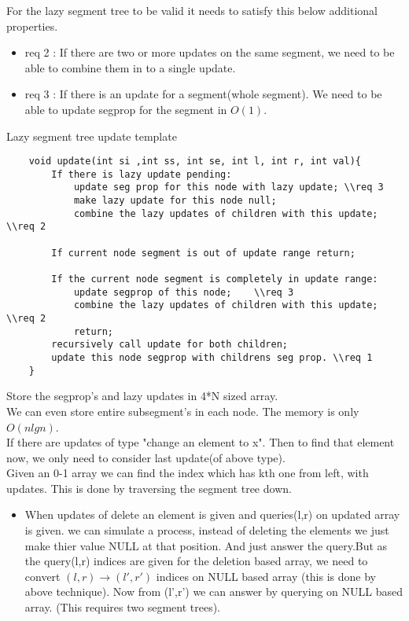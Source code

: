 \documentclass[../Notes.tex]{subfiles}
\begin{document}
For the lazy segment tree to be valid it needs to satisfy this below additional properties.
\begin{itemize}
	\item req 2 : If there are two or more updates on the same segment, we need to be able to combine them in to a single update.
	\item req 3 : If there is an update for a segment(whole segment). We need to be able to update segprop for the segment in $O(1)$.
\end{itemize}
Lazy segment tree update template
\begin{lstlisting}
	void update(int si ,int ss, int se, int l, int r, int val){
		If there is lazy update pending:
			update seg prop for this node with lazy update;	\\req 3
			make lazy update for this node null;
			combine the lazy updates of children with this update;	\\req 2
		
		If current node segment is out of update range return;
		
		If the current node segment is completely in update range:
			update segprop of this node;	\\req 3
			combine the lazy updates of children with this update; \\req 2
			return;
		recursively call update for both children;
		update this node segprop with childrens seg prop. \\req 1
	}
\end{lstlisting}

Store the segprop's and lazy updates in 4*N sized array.\\

We can even store entire subsegment's in each node. The memory is only $O(nlgn)$.\\

If there are updates of type "change an element to x". Then to find that element now, we only need to consider last update(of above type).\\

Given an 0-1 array we can find the index which has kth one from left, with updates. This is done by traversing the segment tree down.\\
\begin{itemize}

\item When updates of delete an element is given and queries(l,r) on updated array is given. we can simulate a process, instead of deleting the elements we just make thier value NULL at that position. And just answer the query.But as the query(l,r) indices are given for the deletion based array, we need to convert $(l,r)\rightarrow (l',r')$ indices on NULL based array (this is done by above technique). Now from (l',r') we can answer by querying on NULL based array. (This requires two segment trees).
\end{itemize}
\end{document}
